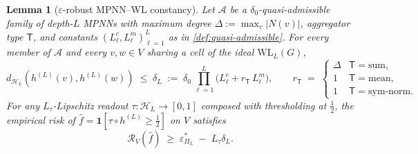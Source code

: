 \documentclass[10pt]{article}
\newtheorem{lemma}[theorem]{Lemma}
\theoremstyle{definition}
\theoremstyle{remark}
\newcommand{\eps}{\varepsilon}
\begin{document}
\begin{lemma}[$\varepsilon$-robust MPNN--WL constancy]\label{lem:mpnn-wl-robust}
Let $\mathcal{A}$ be a $\delta_{0}$-quasi-admissible family of
depth-$L$ MPNNs with maximum degree $\Delta := \max_{v} |N(v)|$,
aggregator type $\mathsf{T}$, and constants
$(L_{\ell}^{c}, L_{\ell}^{m})_{\ell=1}^{L}$ as in
\cref{def:quasi-admissible}. For every member of $\mathcal{A}$
and every $v, w \in V$ sharing a cell of the ideal
$\mathrm{WL}_{L}(G)$,
\[
  d_{\mathcal{H}_{L}}(h^{(L)}(v), h^{(L)}(w))
  \;\le\;
  \delta_{L} \;:=\; \delta_{0}\, \prod_{\ell=1}^{L}
    \bigl(L_{\ell}^{c} + r_{\mathsf{T}}\, L_{\ell}^{m}\bigr),
  \qquad
  r_{\mathsf{T}} \;=\;
  \begin{cases}
    \Delta & \mathsf{T} = \mathrm{sum},\\
    1 & \mathsf{T} = \mathrm{mean},\\
    1 & \mathsf{T} = \mathrm{sym\text{-}norm}.
  \end{cases}
\]
For any $L_{\tau}$-Lipschitz readout
$\tau : \mathcal{H}_{L} \to [0, 1]$ composed with
thresholding at $\tfrac{1}{2}$, the empirical risk of
$\widehat{f} = \mathbf{1}[\tau \circ h^{(L)} \ge \tfrac{1}{2}]$
on $V$ satisfies
\[
  \mathcal{R}_{V}(\widehat{f}) \;\ge\; \eps^{*}_{\Pi_{L}}
  \;-\; L_{\tau} \delta_{L}.
\]
\end{lemma}
\end{document}
